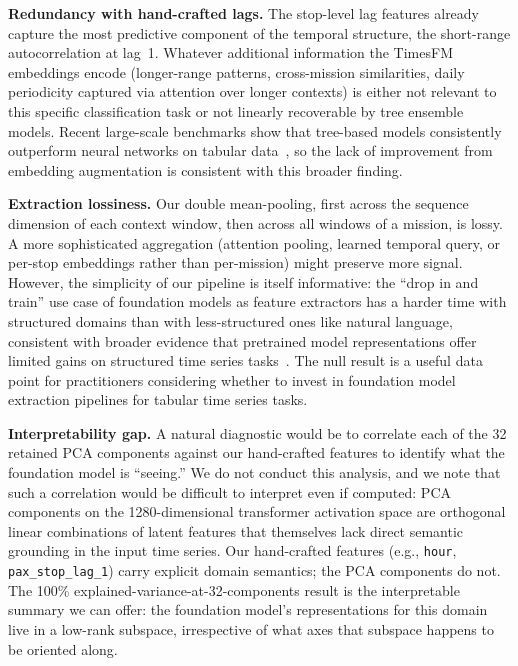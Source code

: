 \textbf{Redundancy with hand-crafted lags.} The stop-level lag features
already capture the most predictive component of the temporal structure,
the short-range autocorrelation at lag~1. Whatever additional information
the TimesFM embeddings encode (longer-range patterns, cross-mission
similarities, daily periodicity captured via attention over longer
contexts) is either not relevant to this specific classification task or
not linearly recoverable by tree ensemble models. Recent large-scale
benchmarks show that tree-based models consistently outperform neural
networks on tabular data~\cite{grinsztajn2022trees}, so the lack of
improvement from embedding augmentation is consistent with this broader
finding.

\textbf{Extraction lossiness.} Our double mean-pooling, first across the
sequence dimension of each context window, then across all windows of a
mission, is lossy. A more sophisticated aggregation (attention pooling,
learned temporal query, or per-stop embeddings rather than per-mission)
might preserve more signal. However, the simplicity of our pipeline is
itself informative: the ``drop in and train'' use case of foundation models
as feature extractors has a harder time with structured domains than with
less-structured ones like natural language, consistent with broader evidence that pretrained model representations
offer limited gains on structured time series
tasks~\cite{zheng2025llmtimeseries}. The null result is a useful
data point for practitioners considering whether to invest in foundation
model extraction pipelines for tabular time series tasks.

\textbf{Interpretability gap.} A natural diagnostic would be to
correlate each of the 32 retained PCA components against our
hand-crafted features to identify what the foundation model is
``seeing.'' We do not conduct this analysis, and we note that such a
correlation would be difficult to interpret even if computed: PCA
components on the 1280-dimensional transformer activation space are
orthogonal linear combinations of latent features that themselves lack
direct semantic grounding in the input time series. Our hand-crafted
features (e.g., \texttt{hour}, \texttt{pax\_stop\_lag\_1}) carry
explicit domain semantics; the PCA components do not. The 100\%
explained-variance-at-32-components result is the interpretable summary
we can offer: the foundation model's representations for this domain
live in a low-rank subspace, irrespective of what axes that subspace
happens to be oriented along.

